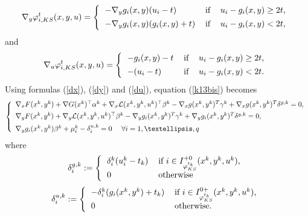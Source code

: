 \begin{equation}
\nabla_{y}\varphi^{t}_{i,KS}(x,y,u)=\left\{
\begin{tabular}
[c]{lll}
$-\nabla_{y}g_{i}(x,y)(u_{i}-t)$ & if & $u_{i}-g_{i}(x,y)\geq2t,$\\[1ex]
$-\nabla_{y}g_{i}(x,y)(g_{i}(x,y)+t)$ & if & $u_{i}-g_{i}(x,y)<2t,$
\end{tabular}
\right. \label{dy}
\end{equation}
and
\begin{equation}
\nabla_{u}\varphi^{t}_{i,KS}(x,y,u)=\left\{
\begin{tabular}
[c]{lll}
$-g_{i}(x,y)-t$ & if & $u_{i}-g_{i}(x,y)\geq2t,$\\[1ex]
$-(u_{i}-t)$ & if & $u_{i}-g_{i}(x,y)<2t.$
\end{tabular}
\right. \label{du}
\end{equation}
Using formulas (\ref{dx}), (\ref{dy}) and (\ref{du}), equation
       	(\ref{k13bis}) becomes
       	\begin{equation}
       	\left\{
       	\begin{array}
       	[c]{l}
       	\nabla_{x}F(x^{k},y^{k})+\nabla G(x^{k})^{\top}\alpha^{k}+\nabla
       	_{x}\mathcal{L}(x^{k},y^{k},u^{k})^{\top}\beta^{k}-\nabla_{x}g(x^{k}%
       	,y^{k})^{T}\gamma^{k}+\nabla_{x}g(x^{k},y^{k})^{T}\delta^{g,k}=0,\\[1ex]
       	\nabla_{y}F(x^{k},y^{k})+\nabla_{y}\mathcal{L}(x^{k},y^{k},u^{k})^{\top}%
       	\beta^{k}-\nabla_{y}g_{i}(x^{k},y^{k})^{T}\gamma^{k}+\nabla_{y}g_{i}%
       	(x^{k},y^{k})^{T}\delta^{g,k}=0,\\[1ex]
       	\nabla_{y}g_{i}(x^{k},y^{k})\beta^{k}+\mu_{i}^{k}-\delta_{i}^{u,k}=0\text{
       		\ \ \ }\forall i=1,\ldots,q
       	\end{array}
       	\right. \label{k15bis}
       	\end{equation}
       	where
       	\begin{equation}
       	\delta_{i}^{g,k}:=\left\{
       	\begin{tabular}
       	[c]{ll}
       	$\delta_{i}^{k}(u_{i}^{k}-t_{k})$ & if $i\in I_{\varphi^{t_{k}}_{KS}}^{+0}(x^{k},y^{k},u^{k})$,\\[1ex]
       	$0$ & otherwise
       	\end{tabular}
       	\right.  \label{k17}
       	\end{equation}
       	\begin{equation}
       	\delta_{i}^{u,k}:=\left\{
       	\begin{tabular}
       	[c]{ll}
       	$-\delta_{i}^{k}(g_{i}(x^{k},y^{k})+t_{k})$ & if $i\in I_{\varphi^{t_{k}}_{KS}}^{0+}
       	(x^{k},y^{k},u^{k})$,\\[1ex]
       	$0$ & otherwise.
       	\end{tabular}
       	\right. \label{k17*}
       	\end{equation}
